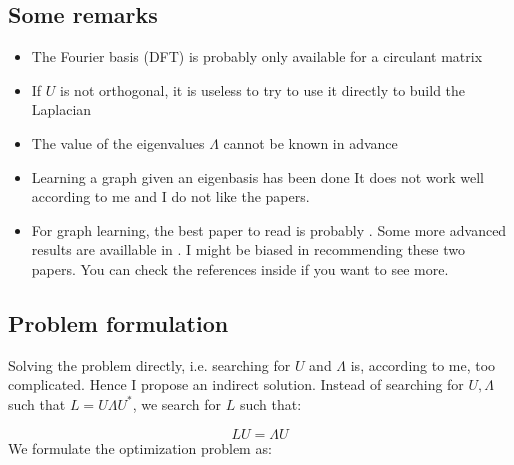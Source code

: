 \subsection*{Some remarks}
\begin{itemize}
	\item The Fourier basis (DFT) is probably only available for a circulant
	matrix
	\item If $U$ is not orthogonal, it is useless to try to use it directly
	to build the Laplacian
	\item The value of the eigenvalues $\Lambda$ cannot be known in advance
	\item Learning a graph given an eigenbasis has been done \cite{pasdeloup2018characterization,shafipour2017network}
	It does not work well according to me and I do not like the papers.
	\item For graph learning, the best paper to read is probably \cite{kalofolias2016learn}.
	Some more advanced results are availlable in \cite{kalofolias2018large}.
	I might be biased in recommending these two papers. You can check
	the references inside if you want to see more.
\end{itemize}

\subsection*{Problem formulation}

Solving the problem directly, i.e. searching for $U$ and $\Lambda$
is, according to me, too complicated. Hence I propose an indirect
solution. Instead of searching for $U,\Lambda$ such that $L=U\Lambda U^{*}$,
we search for $L$ such that:

\[
LU=\Lambda U
\]
We formulate the optimization problem as:

